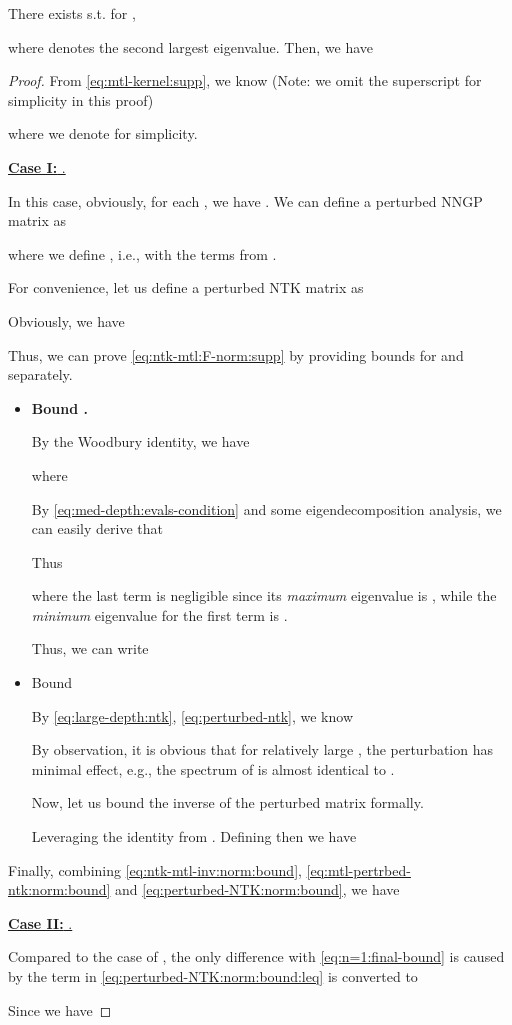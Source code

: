 \documentclass{article}
\begin{document}
\begin{lemma}\label{lemma:kernel-inv-diff}
There exists  s.t. for , 


where  denotes the second largest eigenvalue. Then, we have

    
\end{lemma}

\begin{proof}
From \eqref{eq:mtl-kernel:supp}, we know (Note: we omit the superscript  for simplicity in this proof)

where we denote  for simplicity. 


\underline{\textbf{Case I:} .}


In this case, obviously, for each , we have . We can define a perturbed NNGP matrix as

where we define , i.e.,  with the  terms from .

For convenience, let us define a perturbed NTK matrix as 

Obviously, we have

Thus, we can prove \eqref{eq:ntk-mtl:F-norm:supp} by providing bounds for  and  separately.
\begin{itemize}
    \item \textbf{Bound .}


By the Woodbury identity, we have

where 

By \eqref{eq:med-depth:evals-condition} and some eigendecomposition analysis, we can easily derive that 

Thus 

where the last term is negligible since its \textit{maximum} eigenvalue is , while the \textit{minimum} eigenvalue for the first term is .

Thus, we can write


\item Bound 



By \eqref{eq:large-depth:ntk}, \eqref{eq:perturbed-ntk}, we know

By observation, it is obvious that for relatively large , the perturbation  has minimal effect, e.g., the spectrum of  is almost identical to .

Now, let us bound the inverse of the perturbed matrix  formally. 

Leveraging the identity  from \cite{henderson1981deriving}. Defining 
then we have

\end{itemize}

Finally, combining \eqref{eq:ntk-mtl-inv:norm:bound}, \eqref{eq:mtl-pertrbed-ntk:norm:bound} and \eqref{eq:perturbed-NTK:norm:bound}, we have 



\underline{\textbf{Case II:} .}

Compared to the case of , the only difference with \eqref{eq:n=1:final-bound} is caused by the term  in \eqref{eq:perturbed-NTK:norm:bound:leq} is converted to 

Since 
we have

\end{proof}
\end{document}
